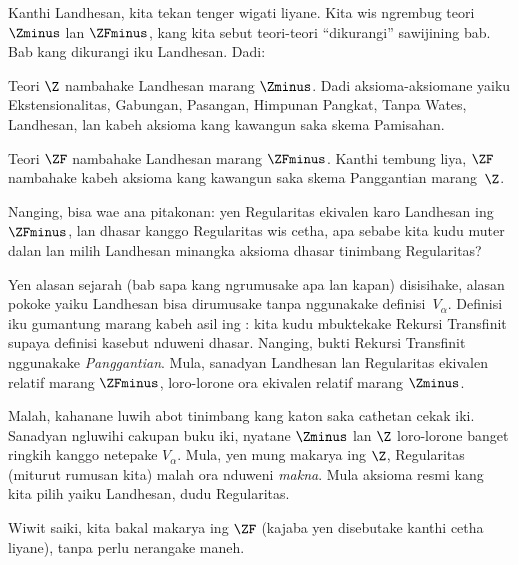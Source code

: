 \documentclass[../../../include/open-logic-section]{subfiles}
\begin{document}

Kanthi Landhesan, kita tekan tenger wigati
liyane. Kita wis ngrembug teori $\Zminus$ lan
$\ZFminus$, kang kita sebut teori-teori
``dikurangi'' sawijining bab. Bab kang dikurangi
iku Landhesan. Dadi:

\begin{defn}
Teori $\Z$ nambahake Landhesan marang
$\Zminus$. Dadi aksioma-aksiomane yaiku
Ekstensionalitas, Gabungan, Pasangan, Himpunan
Pangkat, Tanpa Wates, Landhesan, lan kabeh
aksioma kang kawangun saka skema Pamisahan.

Teori $\ZF$ nambahake Landhesan marang
$\ZFminus$. Kanthi tembung liya, $\ZF$
nambahake kabeh aksioma kang kawangun saka skema Panggantian marang~$\Z$.
\end{defn}

Nanging, bisa wae ana pitakonan: yen Regularitas
ekivalen karo Landhesan ing $\ZFminus$, lan
dhasar kanggo Regularitas wis cetha, apa sebabe
kita kudu muter dalan lan milih Landhesan minangka
aksioma dhasar tinimbang Regularitas?

Yen alasan sejarah (bab sapa kang ngrumusake apa
lan kapan) disisihake, alasan pokoke yaiku
Landhesan bisa dirumusake tanpa nggunakake
definisi~$V_\alpha$. Definisi iku gumantung
marang kabeh asil ing :
kita kudu mbuktekake Rekursi Transfinit supaya
definisi kasebut nduweni dhasar. Nanging,
bukti Rekursi Transfinit nggunakake
\emph{Panggantian}. Mula, sanadyan Landhesan lan
Regularitas ekivalen relatif marang $\ZFminus$,
loro-lorone ora ekivalen relatif marang
$\Zminus$.

Malah, kahanane luwih abot tinimbang kang
katon saka cathetan cekak iki. Sanadyan ngluwihi
cakupan buku iki, nyatane $\Zminus$ lan $\Z$
loro-lorone banget ringkih kanggo netepake
$V_\alpha$. Mula, yen mung makarya ing $\Z$,
Regularitas (miturut rumusan kita) malah ora
nduweni \emph{makna}. Mula aksioma resmi kang
kita pilih yaiku Landhesan, dudu Regularitas.

Wiwit saiki, kita bakal makarya ing $\ZF$
(kajaba yen disebutake kanthi cetha liyane),
tanpa perlu nerangake maneh.
\end{document}
